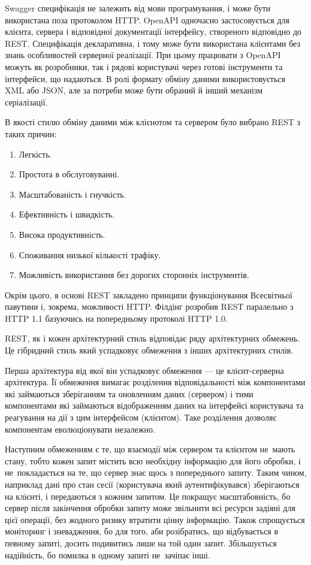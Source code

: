 \documentclass[../main.tex]{subfiles}
\begin{document}
		Swagger специфікація не залежить від мови програмування, і може бути використана поза протоколом HTTP. OpenAPI одночасно застосовується для клієнта, сервера і відповідної документації інтерфейсу, створеного відповідно до REST. Специфікація декларативна, і тому може бути використана клієнтами без знань особливостей серверної реалізації. При цьому працювати з OpenAPI можуть як розробники, так і рядові користувачі через готові інструменти та інтерфейси, що надаються. В ролі формату обміну даними використовується XML або JSON, але за потреби може бути обраний й інший механізм серіалізації.
		
		В якості стилю обміну даними між клієнотом та сервером було вибрано REST з таких причин:
		\begin{enumerate}
			\item Легкість.
			\item Простота в обслуговуванні.
			\item Масштабованість і гнучкість.
			\item Ефективність і швидкість.
			\item Висока продуктивність.
			\item Споживання низької кількості трафіку.
			\item Можливість використання без дорогих сторонніх інструментів.
		\end{enumerate}
		Окрім цього, в основі REST закладено принципи функціонування Всесвітньої павутини і, зокрема, можливості HTTP. Філдінг розробив REST паралельно з HTTP 1.1 базуючись на попередньому протоколі HTTP 1.0.
		
		REST, як і кожен архітектурний стиль відповідає ряду архітектурних обмежень. Це гібридний стиль який успадковує обмеження з інших архітектурних стилів.
		
		Перша архітектура від якої він успадковує обмеження — це клієнт-серверна архітектура. Її обмеження вимагає розділення відповідальності між компонентами які займаються зберіганням та оновленням даних (сервером) і тими компонентами які займаються відображенням даних на інтерфейсі користувача та реагування на дії з цим інтерфейсом (клієнтом). Таке розділення дозволяє компонентам еволюціонувати незалежно.
		
		Наступним обмеженням є те, що взаємодії між сервером та клієнтом не~мають стану, тобто кожен запит містить всю необхідну інформацію для його обробки, і не~покладається на те, що сервер знає щось з попереднього запиту. Таким чином, наприклад дані про стан сесії (користувача який аутентифікувався) зберігаються на клієнті, і передаються з кожним запитом. Це покращує масштабовність, бо сервер після закінчення обробки запиту може звільнити всі ресурси задіяні для цієї операції, без жодного ризику втратити цінну інформацію. Також спрощується моніторинг і зневадження, бо для того, аби розібратись, що відбувається в певному запиті, досить подивитись лише на той один запит. Збільшується надійність, бо помилка в одному запиті не~зачіпає інші.
		
\end{document}

